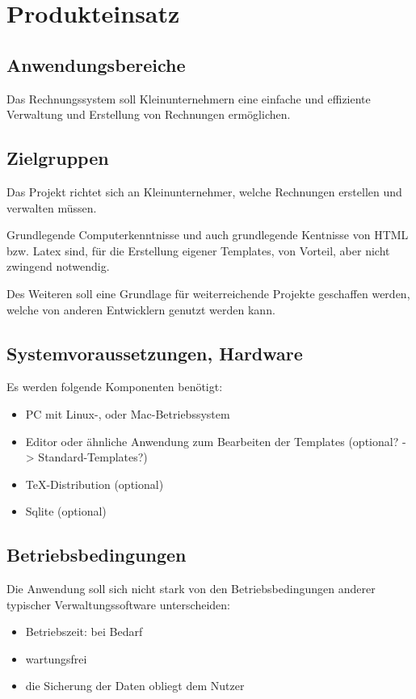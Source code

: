 
\section{Produkteinsatz}


\subsection{Anwendungsbereiche}

Das Rechnungssystem soll Kleinunternehmern eine einfache und effiziente Verwaltung und Erstellung von Rechnungen ermöglichen. 

\subsection{Zielgruppen}

Das Projekt richtet sich an Kleinunternehmer, welche Rechnungen erstellen und verwalten müssen. 

Grundlegende Computerkenntnisse und auch grundlegende Kentnisse von HTML bzw. Latex sind, für die Erstellung eigener Templates, von Vorteil, aber nicht zwingend notwendig.

Des Weiteren soll eine Grundlage für weiterreichende Projekte geschaffen werden, welche von anderen Entwicklern genutzt werden kann.

\subsection{Systemvoraussetzungen, Hardware}
Es werden folgende Komponenten benötigt:
\begin{itemize}
	\item PC mit Linux-, oder Mac-Betriebssystem
	\item Editor oder ähnliche Anwendung zum Bearbeiten der Templates (optional? -> Standard-Templates?)
	\item TeX-Distribution (optional)
	\item Sqlite (optional)
\end{itemize}

\subsection{Betriebsbedingungen}
Die Anwendung soll sich nicht stark von den Betriebsbedingungen anderer typischer Verwaltungssoftware unterscheiden:

\begin{itemize}
	\item Betriebszeit: bei Bedarf
	\item wartungsfrei
	\item die Sicherung der Daten obliegt dem Nutzer
\end{itemize}
